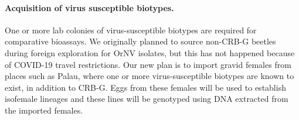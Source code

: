\documentclass[12pt,letterpaper,english,bibliography=totocnumbered,abstract=on]{scrartcl}
\begin{document}
\paragraph{Acquisition of virus susceptible biotypes.} One or more lab colonies of virus-susceptible biotypes are required for comparative bioassays. We
originally planned to source non-CRB-G beetles during foreign exploration for OrNV
isolates, but this has not happened because of COVID-19 travel restrictions.
Our new plan is to import gravid females from places such as Palau, where one or more
virus-susceptible biotypes are known to exist, in addition to CRB-G. Eggs from these
females will be used to establish isofemale lineages and these lines will be genotyped
using DNA extracted from the imported females.
\end{document}
